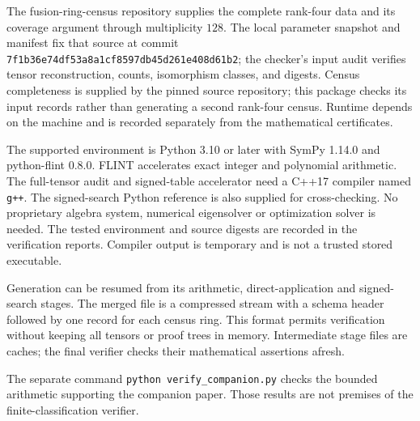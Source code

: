 \documentclass[11pt]{article}
\begin{document}
The fusion-ring-census repository supplies the complete rank-four data
and its coverage argument through multiplicity $128$. The local parameter
snapshot and manifest fix that source at commit
\texttt{7f1b36e74df53a8a1cf8597db45d261e408d61b2}; the checker's
input audit verifies tensor reconstruction, counts, isomorphism classes,
and digests. Census completeness is supplied by the pinned source
repository; this package checks its input records rather than generating
a second rank-four census.
Runtime depends on the machine and is recorded separately from the
mathematical certificates.

The supported environment is Python 3.10 or later with SymPy 1.14.0
and python-flint 0.8.0. FLINT accelerates exact integer and polynomial
arithmetic. The full-tensor audit and signed-table accelerator need a
C++17 compiler named \texttt{g++}.
The signed-search Python reference
is also supplied for cross-checking. No proprietary algebra system,
numerical eigensolver or optimization solver is needed. The tested
environment and source digests are recorded in the verification reports.
Compiler output is temporary and is not a trusted stored executable.

Generation can be resumed from its arithmetic, direct-application and
signed-search stages. The merged file
 is a compressed stream with
a schema header followed by one record for each census ring. This
format permits verification without keeping all tensors or proof trees
in memory. Intermediate stage files are caches; the final verifier
checks their mathematical assertions afresh.

The separate command \texttt{python verify\_companion.py} checks the
bounded arithmetic supporting the companion paper. Those results are
not premises of the finite-classification verifier.
\end{document}

